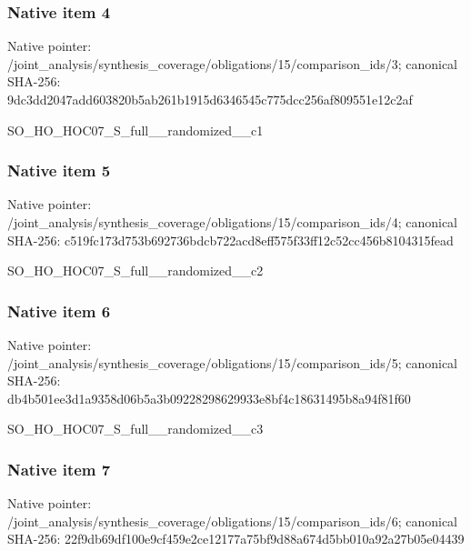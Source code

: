 \documentclass[10pt,a4paper]{article}
\begin{document}
\subsubsection{Native item 4}
Native pointer: /joint\_\allowbreak{}analysis/synthesis\_\allowbreak{}coverage/obligations/15/comparison\_\allowbreak{}ids/3; canonical SHA-256: 9dc3dd2047add603820b5ab261b1915d6346545c775dcc256af809551e12c2af

\begingroup\raggedright\sloppy SO\_\allowbreak{}HO\_\allowbreak{}HOC07\_\allowbreak{}S\_\allowbreak{}full\_\allowbreak{}\_\allowbreak{}randomized\_\allowbreak{}\_\allowbreak{}c1\par\endgroup

\subsubsection{Native item 5}
Native pointer: /joint\_\allowbreak{}analysis/synthesis\_\allowbreak{}coverage/obligations/15/comparison\_\allowbreak{}ids/4; canonical SHA-256: c519fc173d753b692736bdcb722acd8eff575f33ff12c52cc456b8104315fead

\begingroup\raggedright\sloppy SO\_\allowbreak{}HO\_\allowbreak{}HOC07\_\allowbreak{}S\_\allowbreak{}full\_\allowbreak{}\_\allowbreak{}randomized\_\allowbreak{}\_\allowbreak{}c2\par\endgroup

\subsubsection{Native item 6}
Native pointer: /joint\_\allowbreak{}analysis/synthesis\_\allowbreak{}coverage/obligations/15/comparison\_\allowbreak{}ids/5; canonical SHA-256: db4b501ee3d1a9358d06b5a3b09228298629933e8bf4c18631495b8a94f81f60

\begingroup\raggedright\sloppy SO\_\allowbreak{}HO\_\allowbreak{}HOC07\_\allowbreak{}S\_\allowbreak{}full\_\allowbreak{}\_\allowbreak{}randomized\_\allowbreak{}\_\allowbreak{}c3\par\endgroup

\subsubsection{Native item 7}
Native pointer: /joint\_\allowbreak{}analysis/synthesis\_\allowbreak{}coverage/obligations/15/comparison\_\allowbreak{}ids/6; canonical SHA-256: 22f9db69df100e9cf459e2ce12177a75bf9d88a674d5bb010a92a27b05e04439
\end{document}
